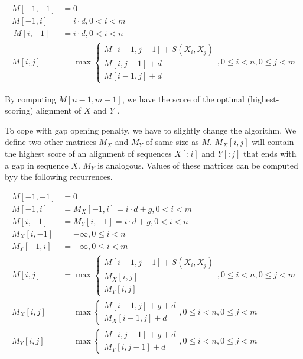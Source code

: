 \begin{align} 
M[-1,-1] &= 0\\
M[-1,i] &= i\cdot d, 0< i < m\\\
M[i,-1] &= i\cdot d, 0< i < n\\
M[i,j] &= \max
\begin{cases}
 M[i-1,j-1]+S(X_i,X_j)\\M[i,j-1]+d\\
 M[i-1,j]+d
\end{cases}, 0\leq i<n,0\leq j<m \label{ALIGN:ALGO:AFFINE}
\end{align}

By computing $M[n-1,m-1]$, we have the score of the optimal (highest-scoring) alignment of $X$ and $Y$ \cite{Durbin1998}. 

To cope with gap opening penalty, we have to slightly change the algorithm.
We define two other matrices $M_X$ and $M_Y$ of same size as $M$. $M_X[i,j]$
will contain the highest score of an alignment of sequences $X[:i]$ and $Y[:j]$
that ends
with a gap in sequence $X$. $M_Y$ is analogous. Values of these matrices can be computed byy the following recurrences.

\begin{align}
M[-1,-1] &= 0\\
M[-1,i] &= M_X[-1,i] = i\cdot d+g, 0 < i < m\\
M[i,-1] &= M_Y[i,-1] = i\cdot d+g, 0 < i < n\\
M_X[i,-1] &= -\infty, 0\leq i< n\\
M_Y[-1,i] &= -\infty, 0 \leq i< m\\
M[i,j] &= \max
\begin{cases}\label{ALIGN:ALGO:REALAFFINESTART}
 M[i-1,j-1]+S(X_i,X_j)\\
 M_X[i,j]\\
 M_Y[i,j]
\end{cases}, 0\leq i<n,0\leq j<m\\
M_X[i,j] &= \max
\begin{cases}
M[i-1,j]+g+d\\
M_X[i-1,j]+d
\end{cases}, 0\leq i<n,0\leq j<m\\
M_Y[i,j] &= \max
\begin{cases}
M[i,j-1]+g+d\\
M_Y[i,j-1]+d
\end{cases}, 0\leq i<n,0\leq j<m\label{ALIGN:ALGO:REALAFFINEEND}
\end{align}

